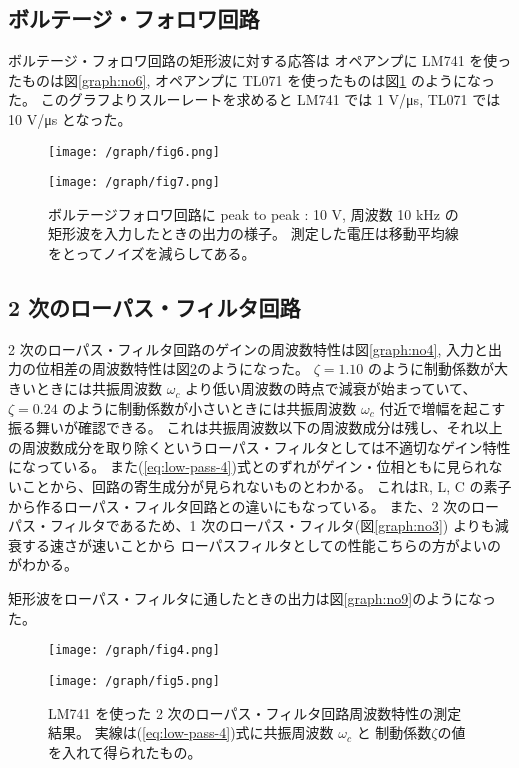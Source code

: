 \documentclass[11pt,dvipdfmx,a4paper]{jsarticle}
\begin{document}
\subsection{ボルテージ・フォロワ回路}
ボルテージ・フォロワ回路の矩形波に対する応答は
オペアンプに LM741 を使ったものは図\ref{graph:no6},
オペアンプに TL071 を使ったものは図\ref{graph:no7} のようになった。
このグラフよりスルーレートを求めると
LM741 では 1 V/\si{\micro s},
TL071 では 10 V/\si{\micro s} となった。
\begin{figure}[H]
	\centering
	\begin{minipage}[t]{0.49\columnwidth}
		\centering
		\texttt{[image: /graph/fig6.png]}
		\label{graph:no6}
	\end{minipage}
	\hfill
	\begin{minipage}[t]{0.49\columnwidth}
		\centering
		\texttt{[image: /graph/fig7.png]}
		\label{graph:no7}
	\end{minipage}
	\caption{ボルテージフォロワ回路に peak to peak : 10 V, 周波数 10 kHz の矩形波を入力したときの出力の様子。
	測定した電圧は移動平均線をとってノイズを減らしてある。}
\end{figure}

\subsection{2 次のローパス・フィルタ回路}
2 次のローパス・フィルタ回路のゲインの周波数特性は図\ref{graph:no4},
入力と出力の位相差の周波数特性は図\ref{graph:no5}のようになった。
\(\zeta = 1.10\) のように制動係数が大きいときには共振周波数 \(\omega_c\) より低い周波数の時点で減衰が始まっていて、
\(\zeta = 0.24\) のように制動係数が小さいときには共振周波数 \(\omega_c\) 付近で増幅を起こす振る舞いが確認できる。
これは共振周波数以下の周波数成分は残し、それ以上の周波数成分を取り除くというローパス・フィルタとしては不適切なゲイン特性になっている。
また(\ref{eq:low-pass-4})式とのずれがゲイン・位相ともに見られないことから、回路の寄生成分が見られないものとわかる。
これはR, L, C の素子から作るローパス・フィルタ回路との違いにもなっている。
また、2 次のローパス・フィルタであるため、1 次のローパス・フィルタ(図\ref{graph:no3}) よりも減衰する速さが速いことから
ローパスフィルタとしての性能こちらの方がよいのがわかる。

矩形波をローパス・フィルタに通したときの出力は図\ref{graph:no9}のようになった。
\begin{figure}[H]
	\centering
	\begin{minipage}[t]{0.49\columnwidth}
		\centering
		\texttt{[image: /graph/fig4.png]}
		\label{graph:no4}
	\end{minipage}
	\hfill
	\begin{minipage}[t]{0.49\columnwidth}
		\centering
		\texttt{[image: /graph/fig5.png]}
		\label{graph:no5}
	\end{minipage}
	\caption{LM741 を使った 2 次のローパス・フィルタ回路周波数特性の測定結果。
	実線は(\ref{eq:low-pass-4})式に共振周波数 \(\omega_c\) と 制動係数\(\zeta\)の値を入れて得られたもの。}
\end{figure}
\end{document}

